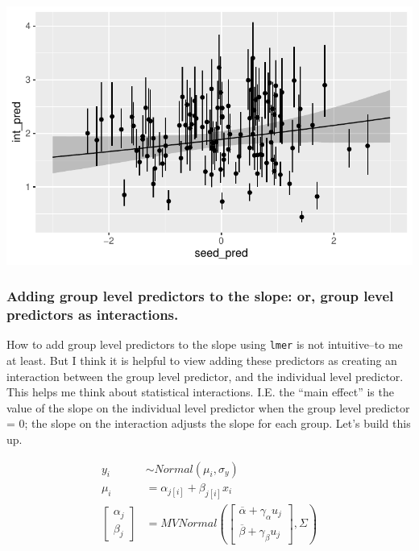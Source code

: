 \documentclass[
  letterpaper,
  DIV=11,
  numbers=noendperiod]{scrartcl}
\begin{document}
\includegraphics{varying_intercepts_varying_slopes_files/figure-pdf/unnamed-chunk-12-1.pdf}

\subsubsection{Adding group level predictors to the slope: or, group
level predictors as
interactions.}\label{adding-group-level-predictors-to-the-slope-or-group-level-predictors-as-interactions.}

How to add group level predictors to the slope using \texttt{lmer} is
not intuitive--to me at least. But I think it is helpful to view adding
these predictors as creating an interaction between the group level
predictor, and the individual level predictor. This helps me think about
statistical interactions. I.E. the ``main effect'' is the value of the
slope on the individual level predictor when the group level predictor =
0; the slope on the interaction adjusts the slope for each group. Let's
build this up.

\[
\begin{align*}
y_i &\sim Normal(\mu_i, \sigma_y)\\
\mu_i &= \alpha_{j[i]} + \beta_{j[i]} x_i\\
\begin{bmatrix} \alpha_j \\ \beta_j \end{bmatrix} &= MVNormal(\begin{bmatrix} \overline{\alpha} + \gamma_{\alpha} u_j \\ \overline{\beta} + \gamma_{\beta} u_j \end{bmatrix}, \Sigma)
\end{align*}
\]
\end{document}
